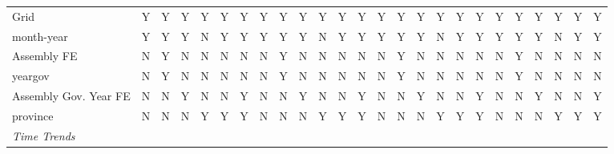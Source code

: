 \begin{table}[htbp]
\begin{tabular}{lcccccccccccccccccccccccc}
      Grid                      & Y             & Y             & Y                  & Y             & Y             & Y             & Y             & Y             & Y             & Y             & Y             & Y             & Y            & Y             & Y            & Y             & Y             & Y            & Y       & Y       & Y       & Y             & Y       & Y\\  
      month-year                & Y             & Y             & Y                  & N             & Y             & Y             & Y             & Y             & Y             & N             & Y             & Y             & Y            & Y             & Y            & N             & Y             & Y            & Y       & Y       & Y       & N             & Y       & Y\\  
      Assembly FE               & N             & Y             & N                  & N             & N             & N             & N             & Y             & N             & N             & N             & N             & N            & Y             & N            & N             & N             & N            & N       & Y       & N       & N             & N       & N\\  
      yeargov                   & N             & Y             & N                  & N             & N             & N             & N             & Y             & N             & N             & N             & N             & N            & Y             & N            & N             & N             & N            & N       & Y       & N       & N             & N       & N\\  
      Assembly Gov. Year FE     & N             & N             & Y                  & N             & N             & Y             & N             & N             & Y             & N             & N             & Y             & N            & N             & Y            & N             & N             & Y            & N       & N       & Y       & N             & N       & Y\\  
      province                  & N             & N             & N                  & Y             & Y             & Y             & N             & N             & N             & Y             & Y             & Y             & N            & N             & N            & Y             & Y             & Y            & N       & N       & N       & Y             & Y       & Y\\  
      \midrule \emph{Time Trends}\\

\end{tabular}
\end{table}

